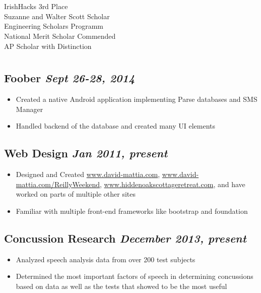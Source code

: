 \documentclass[10pt]{article}
\begin{document}
\begin{minipage}[t]{0.35\textwidth}
	\section*{}
		{IrishHacks 3rd Place\\
		Suzanne and Walter Scott Scholar\\
		Engineering Scholars Programm\\
		National Merit Scholar Commended\\
		AP Scholar with Distinction}

\end{minipage}
\hfill %
\begin{minipage}[t]{0.57\textwidth} %

	\section*{}
		\subsection*{Foober \hfill \small\emph{Sept 26-28, 2014}}
		\begin{itemize}[noitemsep,nolistsep]
			\item Created a native Android application implementing Parse databases and SMS Manager
			\item Handled backend of the database and created many UI elements
		\end{itemize}

		\subsection*{Web Design \hfill \small\emph{Jan 2011, present}}
		\begin{itemize}[noitemsep,nolistsep]
			\item Designed and Created \mbox{\url{www.david-mattia.com}}, \mbox{\url{www.david-mattia.com/ReillyWeekend}},
				\mbox{\url{www.hiddenoakscottageretreat.com}}, and have worked on parts of multiple other sites
			\item Familiar with multiple front-end frameworks like bootstrap and foundation
		\end{itemize}

		\subsection*{Concussion Research \hfill \small\emph{December 2013, present}}
		\begin{itemize}[noitemsep,nolistsep]
			\item Analyzed speech analysis data from over 200 test subjects
			\item Determined the most important factors of speech in determining concussions based on data as well as the tests that showed to be the most useful
		\end{itemize}


\end{minipage}
\end{document}
